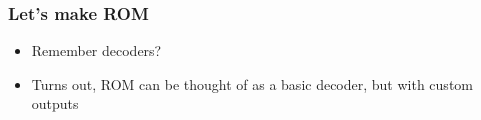 \documentclass{beamer}
\begin{document}
             \begin{frame}
             	\frametitle{Let's make ROM}
             	\begin{itemize}
             		\item Remember decoders?
             		\item Turns out, ROM can be thought of as a basic decoder, but with custom outputs
             	\end{itemize}
             	
             	\centering
             	
             	


\begin{tikzpicture}[x=0.75pt,y=0.75pt,yscale=-1,xscale=1]


\end{tikzpicture}
\end{frame}
\end{document}
